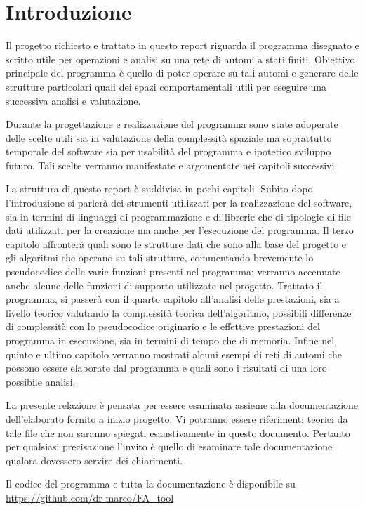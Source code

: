\section{Introduzione}

Il progetto richiesto e trattato in questo report riguarda il programma disegnato e scritto utile per operazioni e analisi su una rete di automi a stati finiti. 
Obiettivo principale del programma è quello di poter operare su tali automi e generare delle strutture particolari quali dei spazi comportamentali utili per eseguire una successiva analisi e valutazione.

Durante la progettazione e realizzazione del programma sono state adoperate delle scelte utili sia in valutazione della complessità spaziale ma soprattutto temporale del software
sia per usabilità del programma e ipotetico sviluppo futuro. Tali scelte verranno manifestate e argomentate nei capitoli successivi.

La struttura di questo report è suddivisa in pochi capitoli. Subito dopo l'introduzione si parlerà dei strumenti utilizzati per la realizzazione del software, sia in termini di linguaggi di programmazione e di librerie che di tipologie di file dati utilizzati per la creazione ma anche per l'esecuzione del programma. 
Il terzo capitolo affronterà quali sono le strutture dati che sono alla base del progetto e gli algoritmi che operano su tali strutture, commentando brevemente lo pseudocodice delle varie funzioni presenti nel programma; verranno accennate anche alcune delle funzioni di supporto utilizzate nel progetto.
Trattato il programma, si passerà con il quarto capitolo all'analisi delle prestazioni, sia a livello teorico valutando la complessità teorica dell'algoritmo, possibili differenze di complessità con lo pseudocodice originario e le effettive prestazioni del programma in esecuzione, sia in termini di tempo che di memoria.
Infine nel quinto e ultimo capitolo verranno mostrati alcuni esempi di reti di automi che possono essere elaborate dal programma e quali sono i risultati di una loro possibile analisi.

La presente relazione è pensata per essere esaminata assieme alla documentazione dell'elaborato fornito a inizio progetto. Vi potranno essere riferimenti teorici da tale file che non saranno spiegati esaustivamente in questo documento.
Pertanto per qualsiasi precisazione l'invito è quello di esaminare tale documentazione qualora dovessero servire dei chiarimenti.

Il codice del programma e tutta la documentazione è disponibile su \url{https://github.com/dr-marco/FA_tool}
